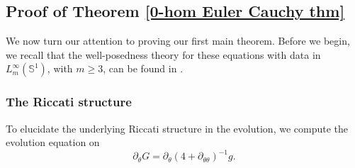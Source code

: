 \documentclass[10pt]{article}
\numberwithin{equation}{section}
\theoremstyle{plain}
\theoremstyle{definition}
\numberwithin{equation}{section}
\begin{document}
\subsection{Proof of Theorem \ref{0-hom Euler Cauchy thm} }

We now turn our attention to proving our first main theorem. Before we begin, we recall that the well-posedness theory for these equations with data in $L_m^\infty(\mathbb{S}^1)$, with $m \geq 3$, can be found in \cite{EJ-symmetries}. 

\subsubsection{The Riccati structure }
To elucidate the underlying Riccati structure in the evolution, we compute the evolution equation on $$\partial_\theta G=\partial_\theta(4+\partial_{\theta \theta})^{-1}g.$$
\end{document}
